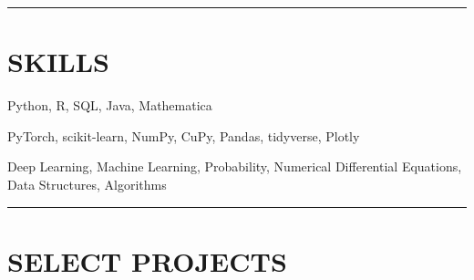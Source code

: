 \documentclass{simplecv}
\begin{document}
\rule{10cm}{0.5pt}

\vspace{-0.4cm}


\section{SKILLS}
 Python, R, SQL, Java, Mathematica

 PyTorch, scikit-learn, NumPy, CuPy, Pandas, tidyverse, Plotly

 Deep Learning, Machine Learning, Probability, Numerical Differential Equations, Data Structures, Algorithms

\vspace{-0.2cm}

\rule{10cm}{0.5pt}

\vspace{-0.4cm}

\section{SELECT PROJECTS}
\end{document}
